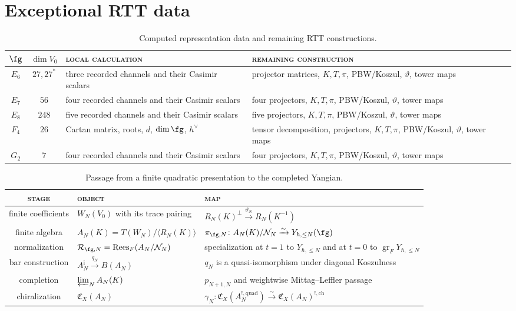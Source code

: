 \section{Exceptional RTT data}
\label{sec:exceptional-yangian-summary}

\begin{table}[ht]
\centering
\small
\caption{Computed representation data and remaining RTT constructions.}
\label{tab:exceptional-yangian-theorem-status}
\begin{tabular}{c|c|p{4.1cm}|p{5.2cm}}
$\fg$&$\dim V_0$&\textsc{local calculation}&\textsc{remaining construction}\\ \hline
$E_6$&$27,27^*$&three recorded channels and their Casimir scalars&
projector matrices, $K,T,\pi$, PBW/Koszul, $\vartheta$, tower maps\\
$E_7$&$56$&four recorded channels and their Casimir scalars&
four projectors, $K,T,\pi$, PBW/Koszul, $\vartheta$, tower maps\\
$E_8$&$248$&five recorded channels and their Casimir scalars&
five projectors, $K,T,\pi$, PBW/Koszul, $\vartheta$, tower maps\\
$F_4$&$26$&Cartan matrix, roots, $d$, $\dim\fg$, $h^\vee$&
tensor decomposition, projectors, $K,T,\pi$, PBW/Koszul, $\vartheta$, tower maps\\
$G_2$&$7$&four recorded channels and their Casimir scalars&
four projectors, $K,T,\pi$, PBW/Koszul, $\vartheta$, tower maps
\end{tabular}
\end{table}

\begin{table}[ht]
\centering
\small
\caption{Passage from a finite quadratic presentation to the completed Yangian.}
\label{tab:exceptional-yangian-ambient-registers}
\begin{tabular}{c|p{4.8cm}|p{5.4cm}}
\textsc{stage}&\textsc{object}&\textsc{map}\\ \hline
finite coefficients&$W_N(V_0)$ with its trace pairing&
$R_N(K)^\perp\xrightarrow{\vartheta_N}R_N(K^{-1})$\\
finite algebra&$A_N(K)=T(W_N)/\langle R_N(K)\rangle$&
$\pi_{\fg,N}\colon A_N(K)/\mathcal N_N\xrightarrow{\sim}Y_{\hbar,\le N}(\fg)$\\
normalization&$\mathcal R_{\fg,N}=\operatorname{Rees}_F(A_N/\mathcal N_N)$&
specialization at $t=1$ to $Y_{\hbar,\le N}$ and at $t=0$ to
$\operatorname{gr}_F Y_{\hbar,\le N}$\\
bar construction&$A_N^{\mathrm i}\xrightarrow{q_N}B(A_N)$&
$q_N$ is a quasi-isomorphism under diagonal Koszulness\\
completion&$\varprojlim_N A_N(K)$&
$p_{N+1,N}$ and weightwise Mittag--Leffler passage\\
chiralization&$\mathfrak C_X(A_N)$&
$\gamma_N\colon\mathfrak C_X(A_N^{!,\mathrm{quad}})\xrightarrow{\sim}
\mathfrak C_X(A_N)^{!,\mathrm{ch}}$
\end{tabular}
\end{table}

